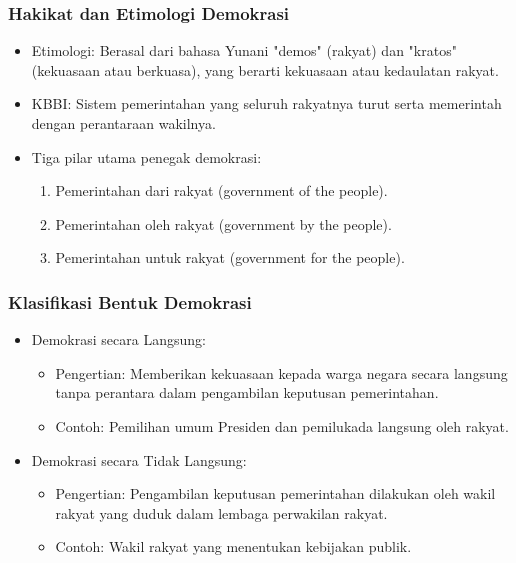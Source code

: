 \subsubsection{Hakikat dan Etimologi Demokrasi}
\begin{itemize}
\item Etimologi: Berasal dari bahasa Yunani "demos" (rakyat) dan "kratos" (kekuasaan atau berkuasa), yang berarti kekuasaan atau kedaulatan rakyat.
\item KBBI: Sistem pemerintahan yang seluruh rakyatnya turut serta memerintah dengan perantaraan wakilnya.
\item Tiga pilar utama penegak demokrasi:
  \begin{enumerate}
  \item Pemerintahan dari rakyat (government of the people).
  \item Pemerintahan oleh rakyat (government by the people).
  \item Pemerintahan untuk rakyat (government for the people).
  \end{enumerate}
\end{itemize}

\subsubsection{Klasifikasi Bentuk Demokrasi}
\begin{itemize}
\item Demokrasi secara Langsung:
  \begin{itemize}
  \item Pengertian: Memberikan kekuasaan kepada warga negara secara langsung tanpa perantara dalam pengambilan keputusan pemerintahan.
  \item Contoh: Pemilihan umum Presiden dan pemilukada langsung oleh rakyat.
  \end{itemize}
\item Demokrasi secara Tidak Langsung:
  \begin{itemize}
  \item Pengertian: Pengambilan keputusan pemerintahan dilakukan oleh wakil rakyat yang duduk dalam lembaga perwakilan rakyat.
  \item Contoh: Wakil rakyat yang menentukan kebijakan publik.
  \end{itemize}
\end{itemize}
